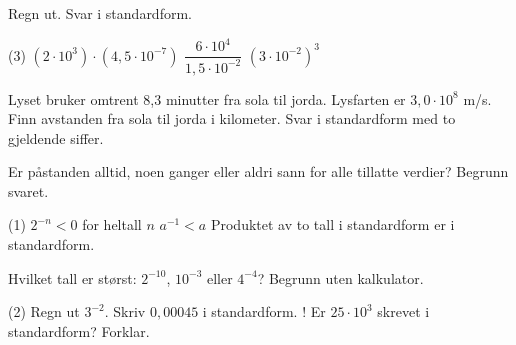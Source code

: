 Regn ut. Svar i standardform.
\begin{tasks}(3)
  \task $(2 \cdot 10^3) \cdot (4,5 \cdot 10^{-7})$
  \task $\dfrac{6 \cdot 10^4}{1,5 \cdot 10^{-2}}$
  \task $(3 \cdot 10^{-2})^3$
\end{tasks}

Lyset bruker omtrent 8,3 minutter fra sola til jorda. Lysfarten er $3,0 \cdot 10^8$ m/s.
Finn avstanden fra sola til jorda i kilometer. Svar i standardform med to gjeldende siffer.


Er påstanden alltid, noen ganger eller aldri sann for alle tillatte verdier? Begrunn svaret.
\begin{tasks}(1)
  \task $2^{-n} < 0$ for heltall $n$
  \task $a^{-1} < a$
  \task Produktet av to tall i standardform er i standardform.
\end{tasks}

Hvilket tall er størst: $2^{-10}$, $10^{-3}$ eller $4^{-4}$? Begrunn uten kalkulator.

\begin{sjekk}
\begin{tasks}(2)
  \task Regn ut $3^{-2}$.
  \task Skriv $0,00045$ i standardform.
  \task! Er $25 \cdot 10^3$ skrevet i standardform? Forklar.
\end{tasks}
\end{sjekk}
